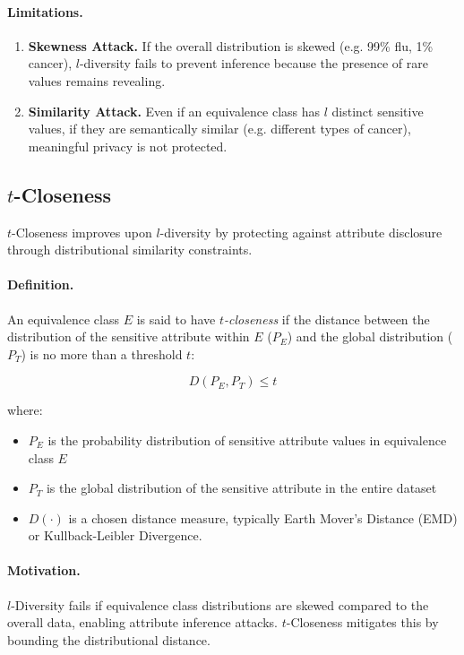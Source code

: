\documentclass{article}
\begin{document}
\paragraph{Limitations.}
\begin{enumerate}
    \item \textbf{Skewness Attack.} If the overall distribution is skewed (e.g. 99\% flu, 1\% cancer), $l$-diversity fails to prevent inference because the presence of rare values remains revealing.

    \item \textbf{Similarity Attack.} Even if an equivalence class has $l$ distinct sensitive values, if they are semantically similar (e.g. different types of cancer), meaningful privacy is not protected.
\end{enumerate}


\subsection{$t$-Closeness }

$t$-Closeness improves upon $l$-diversity by protecting against attribute disclosure through distributional similarity constraints.
\paragraph{ Definition.}
An equivalence class $E$ is said to have \textit{$t$-closeness} if the distance between the distribution of the sensitive attribute within $E$ ($P_E$) and the global distribution ($P_T$) is no more than a threshold $t$:

\[
D(P_E, P_T) \le t
\]

where:
\begin{itemize}
    \item $P_E$ is the probability distribution of sensitive attribute values in equivalence class $E$
    \item $P_T$ is the global distribution of the sensitive attribute in the entire dataset
    \item $D(\cdot)$ is a chosen distance measure, typically Earth Mover's Distance (EMD) or Kullback-Leibler Divergence.
\end{itemize}

\paragraph{Motivation.}
$l$-Diversity fails if equivalence class distributions are skewed compared to the overall data, enabling attribute inference attacks. $t$-Closeness mitigates this by bounding the distributional distance.
\end{document}
